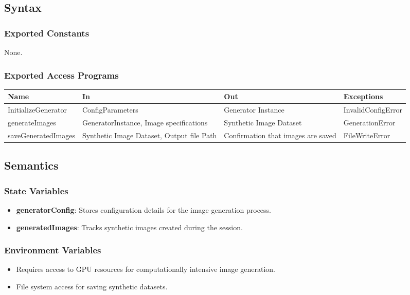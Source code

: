 \documentclass[12pt, titlepage]{article}
\begin{document}
\subsection{Syntax}

\subsubsection{Exported Constants}
None.

\subsubsection{Exported Access Programs}

\begin{center}
  \begin{tabular}{p{3cm} p{4cm} p{4cm} p{5cm}}
    \hline
    \textbf{Name} & \textbf{In} & \textbf{Out} & \textbf{Exceptions} \\
    \hline
    InitializeGenerator & ConfigParameters & Generator Instance & InvalidConfigError \\
    \hline
    generateImages & GeneratorInstance, Image specifications & Synthetic Image Dataset & GenerationError \\
    \hline
    saveGeneratedImages & Synthetic Image Dataset, Output file Path & Confirmation that images are saved & FileWriteError \\
    \hline
  \end{tabular}
\end{center}

\subsection{Semantics}

\subsubsection{State Variables}
\begin{itemize}
    \item \textbf{generatorConfig}: Stores configuration details for the image generation process.
    \item \textbf{generatedImages}: Tracks synthetic images created during the session.
\end{itemize}

\subsubsection{Environment Variables}
\begin{itemize}
    \item Requires access to GPU resources for computationally intensive image generation.
    \item File system access for saving synthetic datasets.
\end{itemize}
\end{document}
